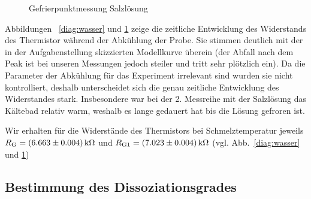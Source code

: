 \begin{figure}    
    
    \caption{Gefrierpunktmessung Salzlösung}
    \label{diag:salz}
\end{figure}

Abbildungen ~\ref{diag:wasser} und \ref{diag:salz} zeige die zeitliche Entwicklung des Widerstands des Thermistor während der Abkühlung der Probe. Sie stimmen deutlich mit der in der Aufgabenstellung skizzierten Modellkurve überein (der Abfall nach dem Peak ist bei unseren Messungen jedoch steiler und tritt sehr plötzlich ein). 
Da die Parameter der Abkühlung für das Experiment irrelevant sind wurden sie nicht kontrolliert, deshalb unterscheidet sich die genau zeitliche Entwicklung des Widerstandes stark. Insbesondere war bei der 2. Messreihe mit der Salzlösung das Kältebad relativ warm, weshalb es lange gedauert hat bis die Lösung gefroren ist.

Wir erhalten für die Widerstände des Thermistors bei Schmelztemperatur jeweils $R_\mathrm{G} = \unit[(6.663 \pm 0.004)]{k\Omega}$ und $R_\mathrm{G1} = \unit[(7.023 \pm 0.004)]{k\Omega}$ (vgl. Abb.~\ref{diag:wasser} und \ref{diag:salz})

\subsection{Bestimmung des Dissoziationsgrades}

